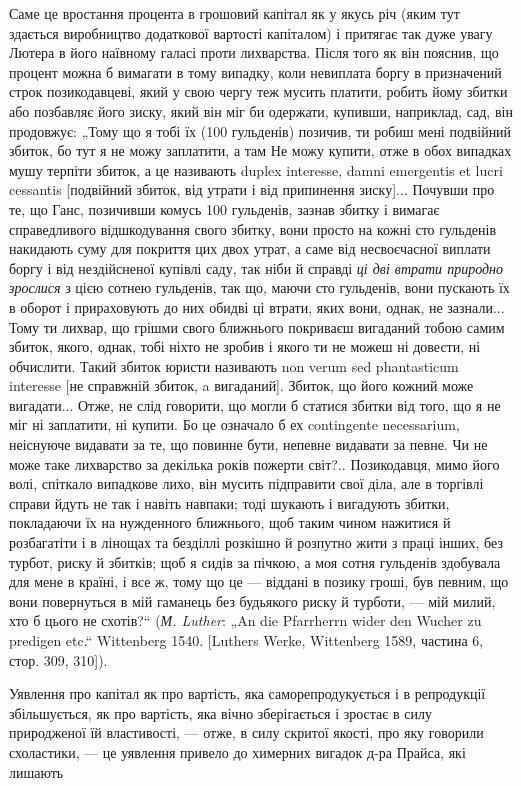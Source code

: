 
Саме це вростання процента в грошовий капітал як у якусь
річ (яким тут здається виробництво додаткової вартості капіталом)
і притягає так дуже увагу Лютера в його наївному
галасі проти лихварства. Після того як він пояснив, що
процент можна б вимагати в тому випадку, коли невиплата
боргу в призначений строк позикодавцеві, який у свою чергу
теж мусить платити, робить йому збитки або позбавляє його
зиску, який він міг би одержати, купивши, наприклад, сад,
він продовжує: „Тому що я тобі їх (100 гульденів) позичив, ти
робиш мені подвійний збиток, бо тут я не можу заплатити,
а там Не можу купити, отже в обох випадках мушу терпіти
збиток, а це називають duplex interesse, damni emergentis et
lucri cessantis [подвійний збиток, від утрати і від припинення
зиску]... Почувши про те, що Ганс, позичивши комусь
100 гульденів, зазнав збитку і вимагає справедливого відшкодування
свого збитку, вони просто на кожні сто гульденів накидають
суму для покриття цих двох утрат, а саме від несвоєчасної
виплати боргу і від нездійсненої купівлі саду, так ніби
й справді \emph{ці дві втрати природно зрослися} з цією сотнею гульденів,
так що, маючи сто гульденів, вони пускають їх в оборот
і прираховують до них обидві ці втрати, яких вони, однак, не
зазнали... Тому ти лихвар, що грішми свого ближнього покриваєш
вигаданий тобою самим збиток, якого, однак, тобі ніхто
не зробив і якого ти не можеш ні довести, ні обчислити. Такий
збиток юристи називають non verum sed phantasticum interesse [не
справжній збиток, a вигаданий]. Збиток, що його кожний може вигадати...
Отже, не слід говорити, що могли б статися збитки від
того, що я не міг ні заплатити, ні купити. Бо це означало б ех
contingente necessarium, неіснуюче видавати за те, що повинне
бути, непевне видавати за певне. Чи не може таке лихварство за
декілька років пожерти світ?.. Позикодавця, мимо його волі, спіткало
випадкове лихо, він мусить підправити свої діла, але в торгівлі
справи йдуть не так і навіть навпаки; тоді шукають і вигадують
збитки, покладаючи їх на нужденного ближнього, щоб таким
чином нажитися й розбагатіти і в лінощах та безділлі розкішно
й розпутно жити з праці інших, без турбот, риску й збитків;
щоб я сидів за пічкою, а моя сотня гульденів здобувала для
мене в країні, і все ж, тому що це — віддані в позику гроші, був
певним, що вони повернуться в мій гаманець без будьякого
риску й турботи, — мій милий, хто б цього не схотів?“ (\emph{М. Luther}:
„An die Pfarrherrn wider den Wucher zu predigen etc.“ Wittenberg
1540. [Luthers Werke, Wittenberg 1589, частина 6, стор. 309,
310]).

Уявлення про капітал як про вартість, яка саморепродукується
і в репродукції збільшується, як про вартість, яка вічно
зберігається і зростає в силу природженої їй властивості, —
отже, в силу скритої якості, про яку говорили схоластики, — це
уявлення привело до химерних вигадок д-ра Прайса, які лишають
\parbreak{}  %
